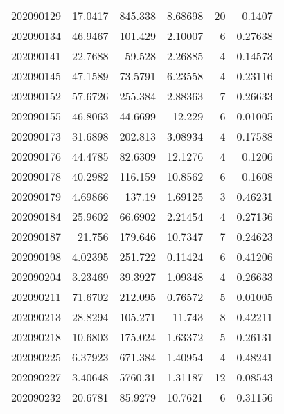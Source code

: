 \begin{tabular}{rrrrrr}
 202090129 &         17.0417  &      845.338  &            8.68698 &          20 & 0.1407  \\
 202090134 &         46.9467  &      101.429  &            2.10007 &           6 & 0.27638 \\
 202090141 &         22.7688  &       59.528  &            2.26885 &           4 & 0.14573 \\
 202090145 &         47.1589  &       73.5791 &            6.23558 &           4 & 0.23116 \\
 202090152 &         57.6726  &      255.384  &            2.88363 &           7 & 0.26633 \\
 202090155 &         46.8063  &       44.6699 &           12.229   &           6 & 0.01005 \\
 202090173 &         31.6898  &      202.813  &            3.08934 &           4 & 0.17588 \\
 202090176 &         44.4785  &       82.6309 &           12.1276  &           4 & 0.1206  \\
 202090178 &         40.2982  &      116.159  &           10.8562  &           6 & 0.1608  \\
 202090179 &          4.69866 &      137.19   &            1.69125 &           3 & 0.46231 \\
 202090184 &         25.9602  &       66.6902 &            2.21454 &           4 & 0.27136 \\
 202090187 &         21.756   &      179.646  &           10.7347  &           7 & 0.24623 \\
 202090198 &          4.02395 &      251.722  &            0.11424 &           6 & 0.41206 \\
 202090204 &          3.23469 &       39.3927 &            1.09348 &           4 & 0.26633 \\
 202090211 &         71.6702  &      212.095  &            0.76572 &           5 & 0.01005 \\
 202090213 &         28.8294  &      105.271  &           11.743   &           8 & 0.42211 \\
 202090218 &         10.6803  &      175.024  &            1.63372 &           5 & 0.26131 \\
 202090225 &          6.37923 &      671.384  &            1.40954 &           4 & 0.48241 \\
 202090227 &          3.40648 &     5760.31   &            1.31187 &          12 & 0.08543 \\
 202090232 &         20.6781  &       85.9279 &           10.7621  &           6 & 0.31156 \\

\end{tabular}

